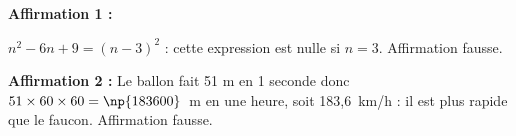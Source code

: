 
\medskip
 
%
%

\textbf{Affirmation 1 :} %

$n^2 - 6n + 9 = (n - 3)^2$ : cette expression est nulle si $n = 3$. Affirmation fausse.
\smallskip

\textbf{Affirmation 2 :} %
Le ballon fait 51 m en 1 seconde donc  $51 \times 60 \times 60 = \np{183600}$~m en une heure, soit 183,6~km/h : il est plus rapide que le faucon. Affirmation fausse.
\vspace{0.25cm}

